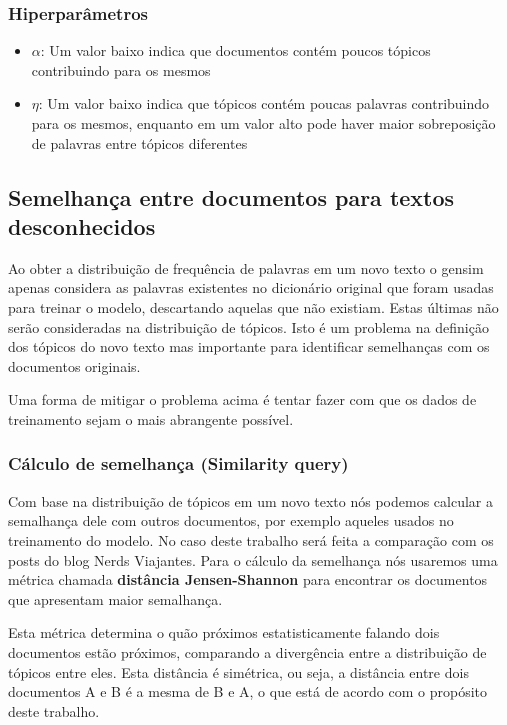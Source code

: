 \subsubsection{Hiperparâmetros}

\begin{itemize}
    \item $\alpha$: Um valor baixo indica que documentos contém poucos tópicos contribuindo para os mesmos
    \item $\eta$: Um valor baixo indica que tópicos contém poucas palavras contribuindo para os mesmos, enquanto em um valor alto pode haver maior sobreposição 
    de palavras entre tópicos diferentes
\end{itemize}

\subsection{Semelhança entre documentos para textos desconhecidos}

Ao obter a distribuição de frequência de palavras em um novo texto o gensim apenas considera as palavras existentes no dicionário original que foram usadas para 
treinar o modelo, descartando aquelas que não existiam. Estas últimas não serão consideradas na distribuição de tópicos. Isto é um problema na definição dos tópicos
do novo texto mas importante para identificar semelhanças com os documentos originais.

Uma forma de mitigar o problema acima é tentar fazer com que os dados de treinamento sejam o mais abrangente possível.

\subsubsection{Cálculo de semelhança (Similarity query)}

Com base na distribuição de tópicos em um novo texto nós podemos calcular a semalhança dele com outros documentos, por exemplo aqueles usados no treinamento
do modelo. No caso deste trabalho será feita a comparação com os posts do blog Nerds Viajantes. Para o cálculo da semelhança nós usaremos uma métrica chamada
\textbf{distância Jensen-Shannon} para encontrar os documentos que apresentam maior semalhança.

Esta métrica determina o quão próximos estatisticamente falando dois documentos estão próximos, comparando a divergência entre a distribuição de tópicos
entre eles. Esta distância é simétrica, ou seja, a distância entre dois documentos A e B é a mesma de B e A, o que está de acordo com o propósito deste trabalho.


